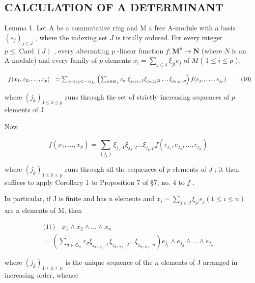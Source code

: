 \subsection{CALCULATION OF A DETERMINANT}

Lemma 1. Let A be a commutative ring and M a free A-module with a basis \((e_j)_{j \in J}\) , where the indexing set \(J\) is totally ordered. For every integer \(p \leqslant \operatorname{Card}(J)\) , every alternating \(p\) -linear function \(f: \mathbf{M}^p \to \mathbf{N}\) (where \(N\) is an A-module) and every family of \(p\) elements \(x_i = \sum_{j \in J} \xi_{ji} e_j\) of \(M\) ( \(1 \leqslant i \leqslant p\) ),

\[
\begin{array}{r l} f (x _ {1}, x _ {2}, \dots , x _ {p}) & = \sum_ {j _ {1} <   j _ {2} <   \dots <   j _ {p}} \left(\sum_ {\sigma \in \mathfrak {S} _ {p}} \varepsilon_ {\sigma}. \xi_ {j _ {\sigma (1)}, 1} \xi_ {j _ {\sigma (2)}, 2} \dots \xi_ {j _ {\sigma (p)}, p}\right) f (e _ {j _ {1}}, \dots , e _ {j _ {p}}) \end{array}\tag{10}
\]

where \((j_k)_{1\leqslant k\leqslant p}\) runs through the set of strictly increasing sequences of \(p\) elements of J.

Now

\[
f (x _ {1}, \dots , x _ {p}) = \sum_ {(j _ {k})} \xi_ {j _ {1}, 1} \xi_ {j _ {2}, 2} \dots \xi_ {j _ {p}, p} f (e _ {j _ {1}}, e _ {j _ {2}}, \dots , e _ {j _ {p}})
\]

where \((j_k)_{1 \leqslant k \leqslant p}\) runs through all the sequences of \(p\) elements of \(J\) ; it then suffices to apply Corollary 1 to Proposition 7 of §7, no. 4 to \(f\) .

In particular, if J is finite and has n elements and \(x_{i} = \sum_{j \in J} \xi_{ji} e_{j} (1 \leqslant i \leqslant n)\) are n elements of M, then

\[
\begin{array}{l} \text {(11)} \quad x _ {1} \wedge x _ {2} \wedge \dots \wedge x _ {n} \\ = \left(\sum_ {\sigma \in \mathfrak {S} _ {n}} \varepsilon_ {\sigma} \xi_ {j _ {\sigma (1)}, 1} \xi_ {j _ {\sigma (2)}, 2} \dots \xi_ {j _ {\sigma (n)}, n}\right) e _ {j _ {1}} \wedge e _ {j _ {2}} \wedge \dots \wedge e _ {j _ {n}} \end{array}
\]

where \((j_k)_{1\leqslant k\leqslant n}\) is the unique sequence of the \(n\) elements of J arranged in increasing order, whence


